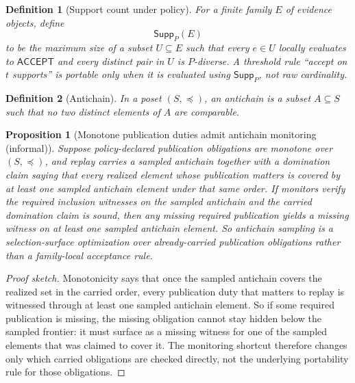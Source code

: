 \documentclass[11pt]{article}
\newtheorem{definition}{Definition}
\newtheorem{proposition}{Proposition}
\theoremstyle{remark}
\newcommand{\Acc}{\mathsf{ACCEPT}}
\newcommand{\Supp}{\mathsf{Supp}}
\begin{document}
\begin{definition}[Support count under policy]
For a finite family $E$ of evidence objects, define
\[
\Supp_P(E)
\]
to be the maximum size of a subset $U\subseteq E$ such that every $e\in U$ locally evaluates to $\Acc$ and every distinct pair in $U$ is $P$-diverse.
A threshold rule ``accept on $t$ supports'' is portable only when it is evaluated using $\Supp_P$, not raw cardinality.
\end{definition}

\begin{definition}[Antichain]
In a poset $(S,\preceq)$, an antichain is a subset $A\subseteq S$ such that no two distinct elements of $A$ are comparable.
\end{definition}

\begin{proposition}[Monotone publication duties admit antichain monitoring (informal)]
Suppose policy-declared publication obligations are monotone over $(S,\preceq)$, and replay carries a sampled antichain together with a domination claim saying that every realized element whose publication matters is covered by at least one sampled antichain element under that same order.
If monitors verify the required inclusion witnesses on the sampled antichain and the carried domination claim is sound,
then any missing required publication yields a missing witness on at least one sampled antichain element.
So antichain sampling is a selection-surface optimization over already-carried publication obligations rather than a family-local acceptance rule.
\end{proposition}

\begin{proof}[Proof sketch]
Monotonicity says that once the sampled antichain covers the realized set in the carried order, every publication duty that matters to replay is witnessed through at least one sampled antichain element.
So if some required publication is missing, the missing obligation cannot stay hidden below the sampled frontier: it must surface as a missing witness for one of the sampled elements that was claimed to cover it.
The monitoring shortcut therefore changes only which carried obligations are checked directly, not the underlying portability rule for those obligations.
\end{proof}
\end{document}
